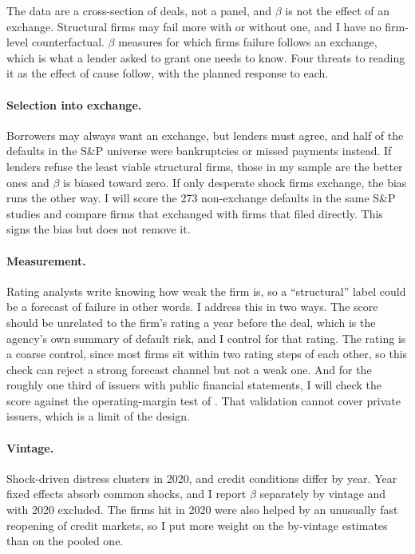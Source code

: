 \documentclass[12pt]{article}
\begin{document}
The data are a cross-section of deals, not a panel, and $\beta$ is not the effect of an exchange. Structural firms may fail more with or without one, and I have no firm-level counterfactual. $\beta$ measures for which firms failure follows an exchange, which is what a lender asked to grant one needs to know. Four threats to reading it as the effect of cause follow, with the planned response to each.

\paragraph{Selection into exchange.} Borrowers may always want an exchange, but lenders must agree, and half of the defaults in the S\&P universe were bankruptcies or missed payments instead. If lenders refuse the least viable structural firms, those in my sample are the better ones and $\beta$ is biased toward zero. If only desperate shock firms exchange, the bias runs the other way. I will score the 273 non-exchange defaults in the same S\&P studies and compare firms that exchanged with firms that filed directly. This signs the bias but does not remove it.

\paragraph{Measurement.} Rating analysts write knowing how weak the firm is, so a ``structural'' label could be a forecast of failure in other words. I address this in two ways. The score should be unrelated to the firm's rating a year before the deal, which is the agency's own summary of default risk, and I control for that rating. The rating is a coarse control, since most firms sit within two rating steps of each other, so this check can reject a strong forecast channel but not a weak one. And for the roughly one third of issuers with public financial statements, I will check the score against the operating-margin test of \citet{andrade1998}. That validation cannot cover private issuers, which is a limit of the design.

\paragraph{Vintage.} Shock-driven distress clusters in 2020, and credit conditions differ by year. Year fixed effects absorb common shocks, and I report $\beta$ separately by vintage and with 2020 excluded. The firms hit in 2020 were also helped by an unusually fast reopening of credit markets, so I put more weight on the by-vintage estimates than on the pooled one.
\end{document}
